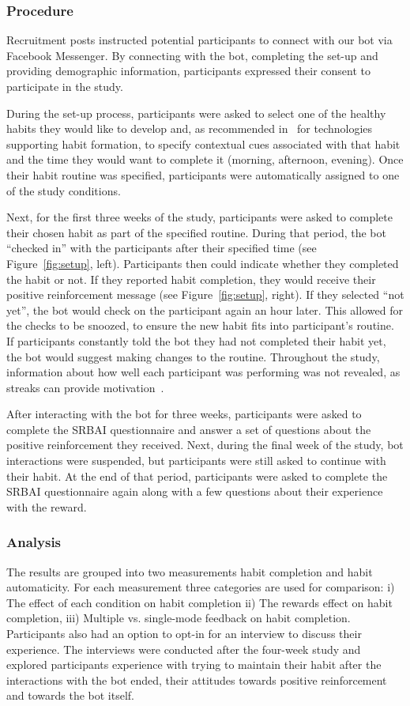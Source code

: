 \documentclass{scaffold/sigchi}
\begin{document}
\subsubsection{Procedure}
Recruitment posts instructed potential participants to connect with our bot via Facebook Messenger. By connecting with the bot, completing the set-up and providing demographic information, participants expressed their consent to participate in the study.

During the set-up process, participants were asked to select one of the healthy habits they would like to develop and, as recommended in~\cite{article_dont_forget_your_pill} for technologies supporting habit formation, to specify contextual cues associated with that habit and the time they would want to complete it (morning, afternoon, evening). Once their habit routine was specified, participants were automatically assigned to one of the study conditions. 

Next, for the first three weeks of the study, participants were asked to complete their chosen habit as part of the specified routine. During that period, the bot ``checked in'' with the participants after their specified time (see Figure~\ref{fig:setup}, left). Participants then could indicate whether they completed the habit or not. If they reported habit completion, they would receive their positive reinforcement message (see Figure~\ref{fig:setup}, right). If they selected ``not yet'', the bot would check on the participant again an hour later. This allowed for the checks to be snoozed, to ensure the new habit fits into participant's routine. If participants constantly told the bot they had not completed their habit yet, the bot would suggest making changes to the routine. Throughout the study, information about how well each participant was performing was not revealed, as streaks can provide motivation~\cite{article_dont_kick_habit}. 

After interacting with the bot for three weeks, participants were asked to complete the SRBAI questionnaire and answer a set of questions about the positive reinforcement they received. Next, during the final week of the study, bot interactions were suspended, but participants were still asked to continue with their habit. At the end of that period, participants were asked to complete the SRBAI questionnaire again along with a few questions about their experience with the reward. 

\subsubsection{Analysis}
The results are grouped into two measurements habit completion and habit automaticity. For each measurement three categories are used for comparison: i) The effect of each condition on habit completion ii) The rewards effect on habit completion, iii) Multiple vs. single-mode feedback on habit completion. Participants also had an option to opt-in for an interview to discuss their experience. The interviews were conducted after the four-week study and explored participants experience with trying to maintain their habit after the interactions with the bot ended, their attitudes towards positive reinforcement and towards the bot itself. 
\end{document}
